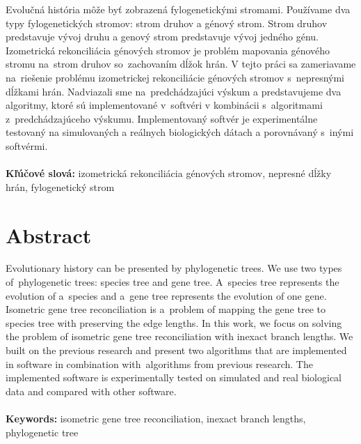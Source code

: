 \documentclass[12pt,a4paper,oneside]{book}
\begin{document}
Evolučná história môže byť zobrazená fylogenetickými stromami. Používame dva typy fylogenetických stromov: strom druhov a génový strom. Strom druhov predstavuje vývoj druhu a genový strom predstavuje vývoj jedného génu. Izometrická rekonciliácia génových stromov je problém mapovania génového stromu na~strom druhov so~zachovaním dĺžok hrán. V tejto práci sa zameriavame na~riešenie problému izometrickej rekonciliácie génových stromov s~nepresnými dĺžkami hrán. Nadviazali sme na~predchádzajúci výskum a predstavujeme dva algoritmy, ktoré sú implementované v~softvéri v kombinácii s~algoritmami z~predchádzajúceho výskumu. Implementovaný softvér je experimentálne testovaný na simulovaných a reálnych biologických dátach a porovnávaný s~inými softvérmi.
\\\\
\textbf{Kľúčové slová:} izometrická rekonciliácia génových stromov, nepresné dĺžky hrán, fylogenetický strom
\vfill\eject 

\chapter*{Abstract}

Evolutionary history can be presented by phylogenetic trees. We use two types of~phylogenetic trees: species tree and gene tree. A~species tree represents the evolution of a~species and a~gene tree represents the evolution of one gene. Isometric gene tree reconciliation is a~problem of mapping the gene tree to species tree with preserving the edge lengths. In this work, we focus on solving the problem of isometric gene tree reconciliation with inexact branch lengths. We built on the previous research and present two algorithms that are implemented in software in combination with~algorithms from previous research. The implemented software is experimentally tested on simulated and real biological data and compared with other software.
\\\\
\textbf{Keywords:} isometric gene tree reconciliation, inexact branch lengths, phylogenetic tree
\vfill\eject  

\listoffigures
\newpage

\tableofcontents
\newpage

\mainmatter


\vfill\eject





\end{document}
